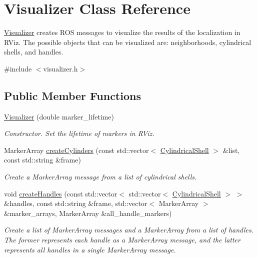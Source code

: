 \hypertarget{class_visualizer}{\section{\-Visualizer \-Class \-Reference}
\label{class_visualizer}
}


\hyperlink{class_visualizer}{\-Visualizer} creates \-R\-O\-S messages to visualize the results of the localization in \-R\-Viz. \-The possible objects that can be visualized are\-: neighborhoods, cylindrical shells, and handles.  




{\ttfamily \#include $<$visualizer.\-h$>$}

\subsection*{\-Public \-Member \-Functions}
\begin{DoxyCompactItemize}
\item 
\hyperlink{class_visualizer_adfc68235bcd211cf2e03754f321430a1}{\-Visualizer} (double marker\-\_\-lifetime)
\begin{DoxyCompactList}\small\item\em \-Constructor. \-Set the lifetime of markers in \-R\-Viz. \end{DoxyCompactList}\item 
\-Marker\-Array \hyperlink{class_visualizer_ac9f5a91f6f1f74422db5e2dcf331e601}{create\-Cylinders} (const std\-::vector$<$ \hyperlink{class_cylindrical_shell}{\-Cylindrical\-Shell} $>$ \&list, const std\-::string \&frame)
\begin{DoxyCompactList}\small\item\em \-Create a \-Marker\-Array message from a list of cylindrical shells. \end{DoxyCompactList}\item 
void \hyperlink{class_visualizer_a4d22320f9f9e51cad69844ae9a974c7b}{create\-Handles} (const std\-::vector$<$ std\-::vector$<$ \hyperlink{class_cylindrical_shell}{\-Cylindrical\-Shell} $>$ $>$ \&handles, const std\-::string \&frame, std\-::vector$<$ \-Marker\-Array $>$ \&marker\-\_\-arrays, \-Marker\-Array \&all\-\_\-handle\-\_\-markers)
\begin{DoxyCompactList}\small\item\em \-Create a list of \-Marker\-Array messages and a \-Marker\-Array from a list of handles. \-The former represents each handle as a \-Marker\-Array message, and the latter represents all handles in a single \-Marker\-Array message. \end{DoxyCompactList}\end{DoxyCompactItemize}


